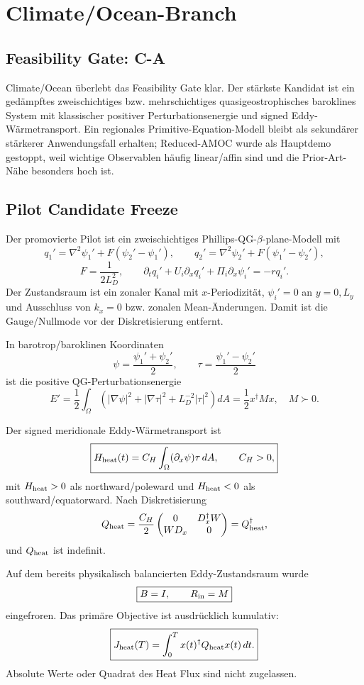\section{Climate/Ocean-Branch}
\subsection{Feasibility Gate: C-A}
Climate/Ocean überlebt das Feasibility Gate klar. Der stärkste Kandidat ist ein gedämpftes zweischichtiges bzw. mehrschichtiges quasigeostrophisches baroklines System mit klassischer positiver Perturbationsenergie und signed Eddy-Wärmetransport. Ein regionales Primitive-Equation-Modell bleibt als sekundärer stärkerer Anwendungsfall erhalten; Reduced-AMOC wurde als Hauptdemo gestoppt, weil wichtige Observablen häufig linear/affin sind und die Prior-Art-Nähe besonders hoch ist.

\subsection{Pilot Candidate Freeze}
Der promovierte Pilot ist ein zweischichtiges Phillips-QG-$\beta$-plane-Modell mit
\[
q_1'=\nabla^2\psi_1'+F(\psi_2'-\psi_1'),
\qquad
q_2'=\nabla^2\psi_2'+F(\psi_1'-\psi_2'),
\]
\[
F=\frac{1}{2L_D^2},
\qquad
\partial_tq_i'+U_i\partial_xq_i'+\Pi_i\partial_x\psi_i'=-rq_i'.
\]
Der Zustandsraum ist ein zonaler Kanal mit $x$-Periodizität, $\psi_i'=0$ an $y=0,L_y$ und Ausschluss von $k_x=0$ bzw. zonalen Mean-Änderungen. Damit ist die Gauge/Nullmode vor der Diskretisierung entfernt.

In barotrop/baroklinen Koordinaten
\[
\psi=\frac{\psi_1'+\psi_2'}2,
\qquad
\tau=\frac{\psi_1'-\psi_2'}2
\]
ist die positive QG-Perturbationsenergie
\[
\boxed{E'=\frac12\int_\Omega\left(|\nabla\psi|^2+|\nabla\tau|^2+L_D^{-2}|\tau|^2\right)dA
=\frac12x^\dagger Mx,\quad M\succ0.}
\]

Der signed meridionale Eddy-Wärmetransport ist
\[
\boxed{H_{\rm heat}(t)=C_H\int_\Omega (\partial_x\psi)\tau\,dA,\qquad C_H>0,}
\]
mit $H_{\rm heat}>0$ als northward/poleward und $H_{\rm heat}<0$ als southward/equatorward. Nach Diskretisierung
\[
Q_{\rm heat}=\frac{C_H}{2}
\begin{pmatrix}
0&D_x^\dagger W\\
WD_x&0
\end{pmatrix}=Q_{\rm heat}^\dagger,
\]
und $Q_{\rm heat}$ ist indefinit.

Auf dem bereits physikalisch balancierten Eddy-Zustandsraum wurde
\[
\boxed{B=I,\qquad R_{\rm in}=M}
\]
eingefroren. Das primäre Objective ist ausdrücklich kumulativ:
\[
\boxed{J_{\rm heat}(T)=\int_0^T x(t)^\dagger Q_{\rm heat}x(t)\,dt.}
\]
Absolute Werte oder Quadrat des Heat Flux sind nicht zugelassen.

